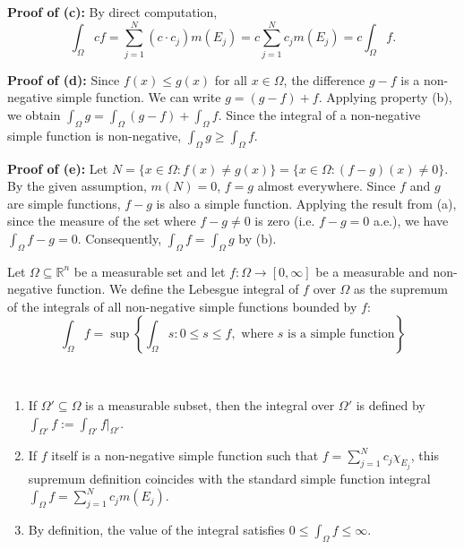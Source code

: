 \begin{pfbox}
    \textbf{Proof of (c):} By direct computation, 
    $$\int_\Omega cf = \displaystyle\sum_{j=1}^N (c \cdot c_j) m(E_j) = c \displaystyle\sum_{j=1}^N c_j m(E_j) = c \int_\Omega f.$$

    \textbf{Proof of (d):} Since $f(x) \le g(x)$ for all $x \in \Omega$, the difference $g - f$ is a non-negative simple function. We can write $g = (g - f) + f$. Applying property (b), we obtain $\int_\Omega g = \int_\Omega (g - f) + \int_\Omega f$. Since the integral of a non-negative simple function is non-negative, $\int_\Omega g \ge \int_\Omega f$.

    \textbf{Proof of (e):} Let $N = \{x \in \Omega : f(x) \neq g(x)\} = \{x \in \Omega : (f - g)(x) \neq 0\}$. By the given assumption, $m(N) = 0$, $f=g$ almost everywhere.
    Since $f$ and $g$ are simple functions, $f-g$ is also a simple function. Applying the result from (a), since the measure of the set where $f-g \neq 0$ is zero (i.e. $f-g=0$ a.e.), we have $\int_\Omega f - g = 0$. Consequently, $\int_\Omega f = \int_\Omega g$ by (b).
\end{pfbox}



\begin{definition}
    Let $\Omega \subseteq \mathbb{R}^n$ be a measurable set and let $f: \Omega \rightarrow [0, \infty]$ be a measurable and non-negative function. We define the Lebesgue integral of $f$ over $\Omega$ as the supremum of the integrals of all non-negative simple functions bounded by $f$:
    $$ \int_\Omega f = \sup \left\{ \int_\Omega s : 0 \le s \le f, \text{ where } s \text{ is a simple function} \right\} $$
\end{definition}

\begin{remark}\ \vspace{-1em}
    \begin{enumerate}
        \item If $\Omega' \subseteq \Omega$ is a measurable subset, then the integral over $\Omega'$ is defined by $\int_{\Omega'} f := \int_{\Omega'} f|_{\Omega'}$.
        \item If $f$ itself is a non-negative simple function such that $f = \displaystyle\sum_{j=1}^N c_j \chi_{E_j}$, this supremum definition coincides with the standard simple function integral $\int_\Omega f = \displaystyle\sum_{j=1}^N c_j m(E_j)$.
        \item By definition, the value of the integral satisfies $0 \le \int_\Omega f \le \infty$.
    \end{enumerate}
\end{remark}

